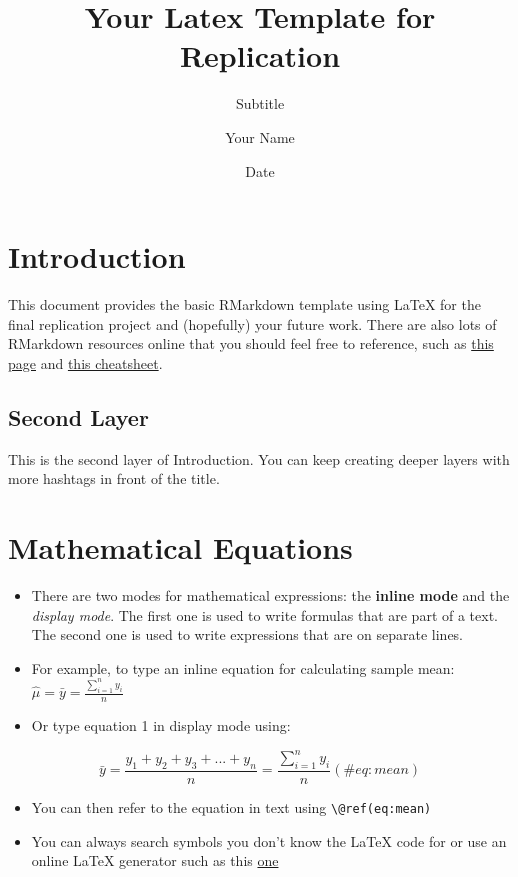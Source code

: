 \documentclass[
  12,
]{article}
\title{Your Latex Template for Replication}
\subtitle{Subtitle}
\author{Your Name}
\date{Date}
\begin{document}
\maketitle

\centerline{}

\section{Introduction}\label{introduction}

This document provides the basic RMarkdown template using LaTeX for the
final replication project and (hopefully) your future work. There are
also lots of RMarkdown resources online that you should feel free to
reference, such as
\href{https://rstudio.github.io/cheatsheets/html/rmarkdown.html}{this
page} and \href{https://rmarkdown.rstudio.com/lesson-15.HTML}{this
cheatsheet}.

\subsection{Second Layer}\label{second-layer}

This is the second layer of Introduction. You can keep creating deeper
layers with more hashtags in front of the title.

\section{Mathematical Equations}\label{mathematical-equations}

\begin{itemize}
\item
  There are two modes for mathematical expressions: the \textbf{inline
  mode} and the \emph{display mode}. The first one is used to write
  formulas that are part of a text. The second one is used to write
  expressions that are on separate lines.
\item
  For example, to type an inline equation for calculating sample mean:
  \(\hat{\mu} = \bar{y} = \frac{\sum_{i = 1}^{n}y_i}{n}\)
\item
  Or type equation 1 in display mode using:
\end{itemize}

\[
\bar{y} = \frac{y_1 + y_2 + y_3 + ... + y_n}{n} = \frac{\sum_{i = 1}^{n} y_i}{n}
(\#eq:mean)
\]

\begin{itemize}
\item
  You can then refer to the equation in text using
  \texttt{\textbackslash{}@ref(eq:mean)}
\item
  You can always search symbols you don't know the LaTeX code for or use
  an online LaTeX generator such as this
  \href{https://latexeditor.lagrida.com/}{one}
\end{itemize}
\end{document}
